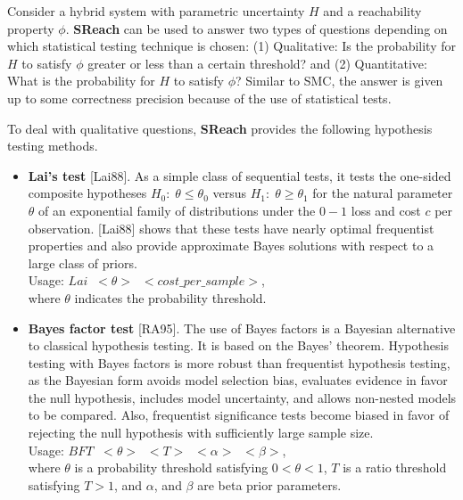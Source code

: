 \documentclass[runningheads,a4paper]{llncs}
\begin{document}
Consider a hybrid system with parametric uncertainty $H$ and a reachability property $\phi$. {\bf SReach} can be used to answer two types of questions depending on which statistical testing technique is chosen: (1) Qualitative: Is the probability for $H$ to satisfy $\phi$ greater or less than a certain threshold? and
(2) Quantitative: What is the probability for $H$ to satisfy $\phi$? Similar to SMC, the answer is given up to some correctness precision because of the use of statistical tests. 

To deal with qualitative questions, {\bf SReach} provides the following hypothesis testing methods.

\begin{itemize}

\item {\bf Lai's test} [Lai88].
As a simple class of sequential tests, it tests the one-sided composite hypotheses $H_0: \; \theta \leq \theta_0$ versus $H_1:\; \theta \geq \theta_1$ for the natural parameter $\theta$ of an exponential family of distributions under the $0-1$ loss and cost $c$ per observation. [Lai88] shows that these tests have nearly optimal frequentist properties and also provide approximate Bayes solutions with respect to a large class of priors. \\
Usage: $Lai\;\; <\theta>\;\; <cost\_per\_ sample>$,\\
where $\theta$ indicates the probability threshold.\\

\item {\bf Bayes factor test} [RA95].
The use of Bayes factors is a Bayesian alternative to classical hypothesis testing. It is based on the Bayes' theorem. Hypothesis testing with Bayes factors is more robust than frequentist hypothesis testing, as the Bayesian form avoids model selection bias, evaluates evidence in favor the null hypothesis, includes model uncertainty, and allows non-nested models to be compared. Also, frequentist significance tests become biased in favor of rejecting the null hypothesis with sufficiently large sample size. \\
Usage: $BFT\;\; <\theta>\;\; <T> \;\;<\alpha> \;\;<\beta>$,\\
where $\theta$ is a probability threshold satisfying $0 < \theta < 1$, $T$ is a ratio threshold satisfying $T > 1$, and $\alpha$, and $\beta$ are beta prior parameters.\\


\end{itemize}
\end{document}
